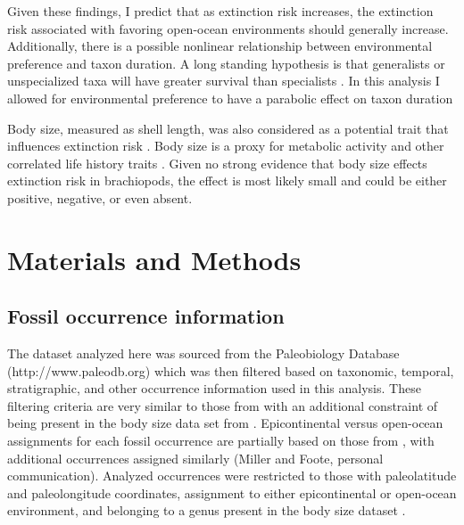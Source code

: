 \documentclass{article}
\begin{document}
Given these findings, I predict that as extinction risk increases, the extinction risk associated with favoring open-ocean environments should generally increase. Additionally, there is a possible nonlinear relationship between environmental preference and taxon duration. A long standing hypothesis is that generalists or unspecialized taxa will have greater survival than specialists \citep{Simpson1944,Liow2004a,Liow2007b,Nurnberg2013a,Nurnberg2015,Baumiller1993}. In this analysis I allowed for environmental preference to have a parabolic effect on taxon duration 

Body size, measured as shell length, was also considered as a potential trait that influences extinction risk \citep{Payne2014}. Body size is a proxy for metabolic activity and other correlated life history traits \citep{Payne2014}. Given no strong evidence that body size effects extinction risk in brachiopods, the effect is most likely small and could be either positive, negative, or even absent.



\section{Materials and Methods}

\subsection{Fossil occurrence information}

The dataset analyzed here was sourced from the Paleobiology Database (http://www.paleodb.org) which was then filtered based on taxonomic, temporal, stratigraphic, and other occurrence information used in this analysis. These filtering criteria are very similar to those from \citet{Foote2013} with an additional constraint of being present in the body size data set from \citet{Payne2014}. Epicontinental versus open-ocean assignments for each fossil occurrence are partially based on those from \citet{Miller2009a}, with additional occurrences assigned similarly (Miller and Foote, personal communication). Analyzed occurrences were restricted to those with paleolatitude and paleolongitude coordinates, assignment to either epicontinental or open-ocean environment, and belonging to a genus present in the body size dataset \citep{Payne2014}. 
\end{document}
